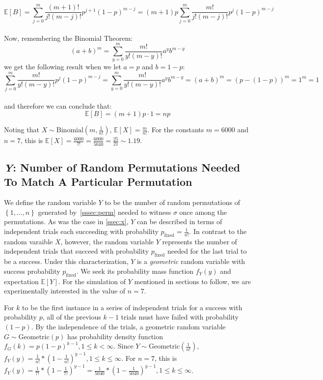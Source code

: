 \documentclass[11pt, oneside]{article}   	%
\begin{document}
$$\mathbb{E}[B]=\sum_{j=0}^{m}\frac{(m+1)!}{j!(m-j)!}p^{j+1}(1-p)^{m-j}=(m+1)p\sum_{j=0}^m\frac{m!}{j!(m-j)!}p^j(1-p)^{m-j}$$\\
Now, remembering the Binomial Theorem:
\begin{equation}
  (a+b)^m=\sum_{y=0}^{m}\frac{m!}{y!(m-y)!}a^yb^{m-y}
  \label{eqn:bt}
\end{equation}
we get the following result when we let $a=p$ and $b=1-p$:\\
\begin{equation*}
  \sum_{j=0}^{m}\frac{m!}{y!(m-y)!}p^j(1-p)^{m-j}=
  \sum_{y=0}^{m}\frac{m!}{y!(m-y)!}a^yb^{m-y}=
  (a+b)^m=(p-(1-p))^m=1^m=1
\end{equation*}\\
and therefore we can conclude that:
$$\mathbb{E}[B]=(m+1)p\cdot 1=np$$

Noting that $X \sim \text{Binomial}(m,\frac{1}{n!})$, $\mathbb{E}[X] = \frac{m}{n!}$. For the constants $m = 6000$ and $n = 7$, this is $\mathbb{E}[X] = \frac{6000}{7!} = \frac{6000}{5040} = \frac{25}{21} \sim 1.19$.

\subsection{\textit{Y}: Number of Random Permutations Needed To Match A Particular Permutation}
We define the random variable $Y$ to be the number of random permutations of $\left\{1, \dots, n\right\}$ generated by~\ref{sssec:perm} needed to witness $\sigma$ once among the permutations. As was the case in \ref{ssec:x}, $Y$ can be described in terms of independent trials each succeeding with probability $p_{\text{fixed}} = \frac{1}{n!}$. In contrast to the random varaible $X$, however, the random variable $Y$ represents the number of independent trials that succeed with probability $p_{\text{fixed}}$ needed for the last trial to be a success. Under this characterization, $Y$ is a \textit{geometric} random variable with success probability $p_{\text{fixed}}$. We seek its probability mass function $f_Y(y)$ and expectation $\mathbb{E}[Y]$. For the simulation of $Y$ mentioned in sections to follow, we are experimentally interested in the value of $n = 7$.

For $k$ to be the first instance in a series of independent trials for a success with probability $p$, all of the previous $k - 1$ trials must have failed with probability $(1 - p)$. By the independence of the trials, a geometric random variable $G \sim \text{Geometric}(p)$ has probability density function $f_G(k) = p(1-p)^{k-1}, 1 \leq k < \infty$. Since $Y \sim \text{Geometric}(\frac{1}{n!})$, $f_Y(y) = \frac{1}{n!} * (1 - \frac{1}{n!})^{y-1}, 1 \leq k \leq \infty$. For $n = 7$, this is $f_Y(y) = \frac{1}{7!} * (1 - \frac{1}{7!})^{y-1} = \frac{1}{5040} * (1 - \frac{1}{5040})^{y-1}, 1 \leq k \leq \infty$.
\end{document}
